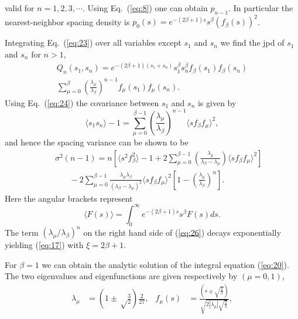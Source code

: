 \documentclass[reprint,amsmath,amssymb,showpacs,aps,]{revtex4-1}
\begin{document}
{valid for $n=1,2,3,\cdots$. Using Eq.~(\ref{eq:8}) one can obtain $p_{n-1}$. In particular the nearest-neighbor spacing density is $p_{0}(s)= e^{-(2\beta+1)s}s^{\beta}(f_{\beta}(s))^{2}$. \par
Integrating Eq.~(\ref{eq:23}) over all variables except $s_{1}$ and $s_{n}$ we find the jpd of $s_{1}$ and $s_{n}$ for $n>1$,
\begin{eqnarray}\label{eq:24}
Q_{n}(s_{1}, s_{n})= e^{-(2\beta+1)(s_{1}+s_{n})}s_{1}^{\beta}s_{n}^{\beta}f_{\beta}(s_{1})f_{\beta}(s_{n})\nonumber \\
\sum_{\mu=0}^{\beta}(\frac{\lambda_{\mu}}{\lambda_{\beta}})^{n-1}f_{\mu}(s_{1})f_{\mu}(s_{n}).
\end{eqnarray}
Using Eq.~(\ref{eq:24}) the covariance between $s_{1}$ and $s_{n}$ is given by
\begin{equation}\label{eq:25}
\langle s_{1}s_{n}\rangle -1 = \sum_{\mu=0}^{\beta -1}\left(\frac{\lambda_{\mu}}{\lambda_{\beta}}\right)^{n-1}\langle sf_{\beta}f_{\mu}\rangle^{2},
\end{equation}
and hence the spacing variance can be shown to be
\begin{eqnarray}
\label{eq:26}
&& \sigma^{2}(n-1) = n\left[\langle s^{2}f_{\beta}^{2}\rangle -1 + 2\sum_{\mu=0}^{\beta -1} \left(\frac{\lambda_{\mu}}{\lambda_{\beta}-\lambda_{\mu}} \right) \langle sf_{\beta}f_{\mu}\rangle ^2 \right] \nonumber \\ 
&& ~~~~~~~~ -2\sum_{\mu=0}^{\beta-1} \frac{\lambda_{\mu}\lambda_{\beta}}{(\lambda_{\beta}-\lambda_{\mu})^{2}}
\langle sf_{\beta}f_{\mu}\rangle ^2 \left[1-\left(\frac{\lambda_{\mu}}{\lambda_{\beta}} \right)^{n}\right].
\end{eqnarray}
Here the angular brackets represent
\begin{equation}\label{eq:27}
\langle F(s) \rangle = \int_{0}^{\infty}e^{-(2\beta+1)s}s^{\beta}F(s)ds.
\end{equation}
The term $\left(\lambda_{\mu}/\lambda_{\beta}\right)^{n}$ on the right hand side of (\ref{eq:26}) decays exponentially yielding (\ref{eq:17}) with $\xi=2\beta +1$.\par 
For $\beta=1$ we can obtain the analytic solution of the integral equation (\ref{eq:20}). The two eigenvalues and eigenfunctions are given 
respectively by $(\mu=0,1)$,
\begin{align}\label{eq:28}
\lambda_{\mu}&=\left(1\pm\sqrt\frac{3}{2}\right)\frac{2}{27}, & f_{\mu}(s)&= \frac{\left(s\pm\sqrt{\frac{2}{3}} \right)}{\sqrt{2|\lambda_{\mu}|\sqrt{\frac{2}{3}}}},

\end{align}}
\end{document}
